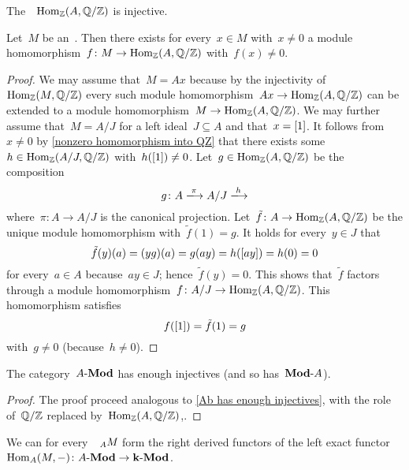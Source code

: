 \begin{example*}
  The~{}~$\operatorname{Hom}_{\mathbb{Z}}(A, \mathbb{Q}/\mathbb{Z})$ is injective.
\end{example*}


\begin{lemma*}
  Let~$M$ be an~{}.
  Then there exists for every~$x \in M$ with~$x \neq 0$ a module homomorphism~$f \colon M \to \operatorname{Hom}_{\mathbb{Z}}(A, \mathbb{Q}/\mathbb{Z})$ with~$f(x) \neq 0$.
\end{lemma*}


\begin{proof}
  We may assume that~$M = A x$ because by the injectivity of~$\operatorname{Hom}_{\mathbb{Z}}(M, \mathbb{Q}/\mathbb{Z})$ every such module homomorphism~$Ax \to \operatorname{Hom}_{\mathbb{Z}}(A, \mathbb{Q}/\mathbb{Z})$ can be extended to a module homomorphism~$M \to \operatorname{Hom}_{\mathbb{Z}}(A, \mathbb{Q}/\mathbb{Z})$.
  We may further assume that~$M = A/J$ for a left ideal~$J \subseteq A$ and that~$x = [1]$.
  It follows from~$x \neq 0$ by \cref{nonzero homomorphism into QZ} that there exists some~$h \in \operatorname{Hom}_{\mathbb{Z}}(A/J, \mathbb{Q}/\mathbb{Z})$ with~$h([1]) \neq 0$.
  Let~$g \in \operatorname{Hom}_{\mathbb{Z}}(A, \mathbb{Q}/\mathbb{Z})$ be the composition
  \[
    g
    \colon
    A
    \xlongto{\pi}
    A/J
    \xlongto{h}
  \]
  where~$\pi \colon A \to A/J$ is the canonical projection.
  Let~$\tilde{f} \colon A \to \operatorname{Hom}_{\mathbb{Z}}(A, \mathbb{Q}/\mathbb{Z})$ be the unique module homomorphism with~$\tilde{f}(1) = g$.
  It holds for every~$y \in J$ that
  \[
    \tilde{f}(y)(a)
    =
    (y g)(a)
    =
    g(ay)
    =
    h([ay])
    =
    h(0)
    =
    0
  \]
  for every~$a \in A$ because~$ay \in J$;
  hence~$\tilde{f}(y) = 0$.
  This shows that~$\tilde{f}$ factors through a {\welldef} module homomorphism~$f \colon A/J \to \operatorname{Hom}_{\mathbb{Z}}(A, \mathbb{Q}/\mathbb{Z})$.
  This homomorphism satisfies
  \[
    f([1])
    =
    \tilde{f}(1)
    =
    g
  \]
  with~$g \neq 0$ (because~$h \neq 0$).
\end{proof}


\begin{corollary}
  The category~$\text{$A$-$\mathbf{Mod}$}$ has enough injectives (and so has~$\text{$\mathbf{Mod}$-$A$}$).
\end{corollary}


\begin{proof}
    The proof proceed analogous to \cref{Ab has enough injectives}, with the role of~$\mathbb{Q}/\mathbb{Z}$ replaced by~$\operatorname{Hom}_{\mathbb{Z}}(A, \mathbb{Q}/\mathbb{Z})$,.
\end{proof}







\begin{remark}
  We can for every~{}~$\indmodule[A]{M}$ form the right derived functors of the left exact functor~$\operatorname{Hom}_A(M, -) \colon \text{$A$-$\mathbf{Mod}$} \to \text{$\mathbf{k}$-$\mathbf{Mod}$}$.
\end{remark}




